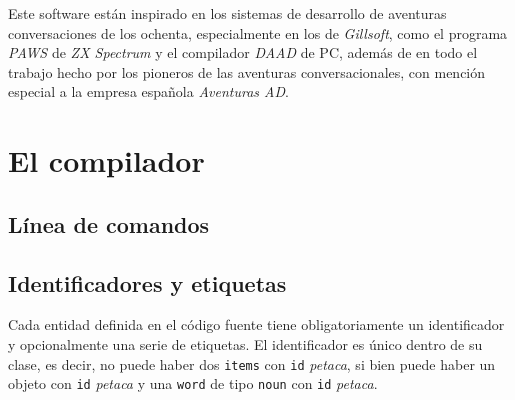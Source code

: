 \documentclass{report}
\newcommand{\ic}[1]{\texttt{#1}}
\newcommand{\la}[1]{\textit{#1}}
\begin{document}
        Este software están inspirado en los sistemas de desarrollo de aventuras conversaciones de los ochenta,
        especialmente en los de \textit{Gillsoft}, como el programa \textit{PAWS} de \textit{ZX Spectrum} y el
        compilador \textit{DAAD} de PC, además de en todo el trabajo hecho por los pioneros de las aventuras
        conversacionales, con mención especial a la empresa española \textit{Aventuras AD}.

\chapter{El compilador}        
    \section{Línea de comandos}
    \section{Identificadores y etiquetas}
        Cada entidad definida en el código fuente tiene obligatoriamente un identificador y opcionalmente una serie de
        etiquetas. El identificador es único dentro de su clase, es decir, no puede haber dos \ic{items} con \ic{id}
        \la{petaca}, si bien puede haber un objeto con \ic{id} \la{petaca} y una \ic{word} de tipo \ic{noun} con \ic{id}
        \la{petaca}.
\end{document}

